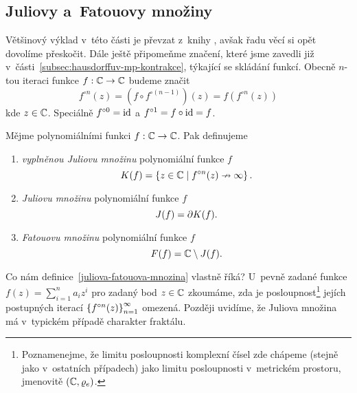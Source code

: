 \subsection{Juliovy a~Fatouovy množiny}\label{subsec:juliovy-fatouovy-mnoziny}

Většinový výklad v~této části je převzat z~knihy \cite[str. 235]{Falconer1989}, avšak řadu věcí si opět dovolíme přeskočit. Dále ještě připomeňme značení, které jsme zavedli již v~části~\ref{subsec:hausdorffuv-mp-kontrakce}, týkající se skládání funkcí. Obecně $n$-tou iteraci funkce $f:\mathbb{C} \rightarrow \mathbb{C}$ budeme značit
\[f^{\circ n}(z)=(f\circ f^{\circ(n-1)})(z)=f(f^{\circ n}(z))\]
kde $z\in\mathbb{C}$. Speciálně $f^{\circ 0}=\operatorname{id}$ a $f^{\circ 1}=f\circ\operatorname{id}=f$.
\begin{definition}\label{juliova-fatouova-mnozina}
    Mějme polynomiálními funkci $f:\mathbb{C} \rightarrow \mathbb{C}$. Pak definujeme
    \begin{enumerate}[label=(\alph*)]
        \item \emph{vyplněnou Juliovu množinu} polynomiální funkce $f$
        \[K(f)=\left\{z\in\mathbb{C}\mid f^{\circ n}(z)\nrightarrow\infty\right\}.\]
        \item \emph{Juliovu množinu} polynomiální funkce $f$
        \[J(f)=\partial K(f).\]
        \item \emph{Fatouovu množinu} polynomiální funkce $f$
        \[F(f)=\mathbb{C}\setminus J(f).\]
    \end{enumerate}
\end{definition}
Co nám definice~\ref{juliova-fatouova-mnozina} vlastně říká? U~pevně zadané funkce $f(z)=\sum_{i=1}^{n}a_iz^i$ pro zadaný bod $z\in\mathbb{C}$ zkoumáme, zda je posloupnost\footnote{Poznamenejme, že limitu posloupnosti komplexní čísel zde chápeme (stejně jako v~ostatních případech) jako limitu posloupnosti v~metrickém prostoru, jmenovitě $(\mathbb{C},\varrho_e)$.} jejích postupných iterací $\left\{f^{\circ n}(z)\right\}_{n=1}^\infty$ omezená. Později uvidíme, že Juliova množina má v~typickém případě charakter fraktálu.
